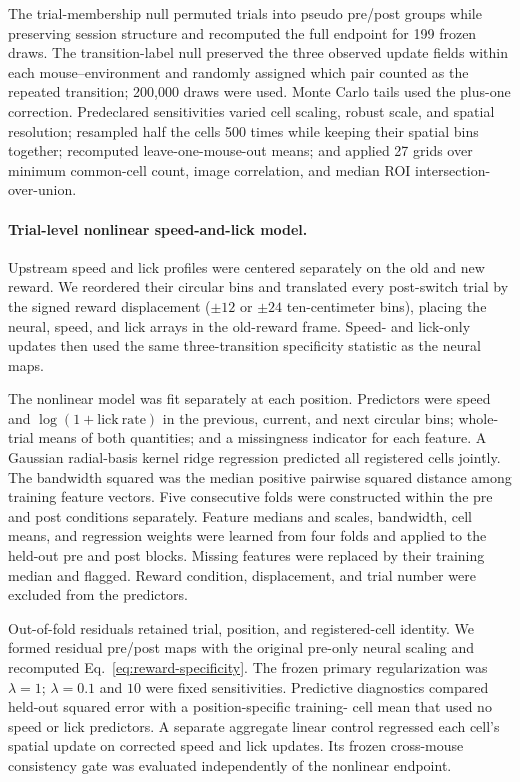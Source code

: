 \documentclass[10pt,twocolumn]{article}
\begin{document}
The trial-membership null permuted trials into pseudo pre/post groups while
preserving session structure and recomputed the full endpoint for 199 frozen
draws. The transition-label null preserved the three observed update fields
within each mouse--environment and randomly assigned which pair counted as the
repeated transition; 200,000 draws were used. Monte Carlo tails used the
plus-one correction. Predeclared sensitivities varied cell scaling, robust
scale, and spatial resolution; resampled half the cells 500 times while keeping
their spatial bins together; recomputed leave-one-mouse-out means; and applied
27 grids over minimum common-cell count, image correlation, and median ROI
intersection-over-union.

\paragraph{Trial-level nonlinear speed-and-lick model.}

Upstream speed and lick profiles were centered separately on the old and new
reward. We reordered their circular bins and translated every post-switch
trial by the signed reward displacement ($\pm12$ or $\pm24$ ten-centimeter
bins), placing the neural, speed, and lick arrays in the old-reward frame.
Speed- and lick-only updates then used the same three-transition
specificity statistic as the neural maps.

The nonlinear model was fit separately at each position. Predictors were speed
and $\log(1+\mathrm{lick\ rate})$ in the previous, current, and next circular
bins; whole-trial means of both quantities; and a missingness indicator for
each feature. A Gaussian radial-basis kernel ridge regression predicted all
registered cells jointly. The bandwidth squared was the median positive
pairwise squared distance among training feature vectors. Five consecutive
folds were constructed within the pre and post conditions separately. Feature
medians and scales, bandwidth, cell means, and regression weights were learned
from four folds and applied to the held-out pre and post blocks. Missing
features were replaced by their training median and flagged. Reward condition,
displacement, and trial number were excluded from the predictors.

Out-of-fold residuals retained trial, position, and registered-cell identity.
We formed residual pre/post maps with the original pre-only neural scaling and
recomputed Eq.~\ref{eq:reward-specificity}. The frozen primary regularization
was $\lambda=1$; $\lambda=0.1$ and $10$ were fixed sensitivities. Predictive
diagnostics compared held-out squared error with a position-specific training-
cell mean that used no speed or lick predictors. A separate aggregate linear control regressed
each cell's spatial update on corrected speed and lick updates. Its frozen
cross-mouse consistency gate was evaluated independently of the nonlinear
endpoint.
\end{document}
